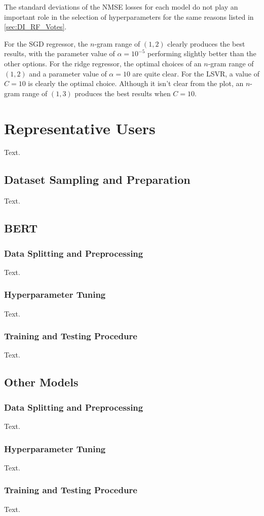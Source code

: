 The standard deviations of the NMSE losses for each model do not play an important role in the selection of hyperparameters for the same reasons listed in \ref{sec:DI_RF_Votes}.

For the SGD regressor, the $n$-gram range of $(1, 2)$ clearly produces the best results, with the parameter value of $\alpha=10^{-5}$ performing slightly better than the other options. For the ridge regressor, the optimal choices of an $n$-gram range of $(1, 2)$ and a parameter value of $\alpha=10$ are quite clear. For the LSVR, a value of $C=10$ is clearly the optimal choice. Although it isn't clear from the plot, an $n$-gram range of $(1, 3)$ produces the best results when $C=10$.

\section{Representative Users} \label{sec:DI_RU}

Text.

\subsection{Dataset Sampling and Preparation}

Text.

\subsection{BERT}

\subsubsection{Data Splitting and Preprocessing}

Text.

\subsubsection{Hyperparameter Tuning}

Text.

\subsubsection{Training and Testing Procedure}

Text.

\subsection{Other Models}

\subsubsection{Data Splitting and Preprocessing}

Text.

\subsubsection{Hyperparameter Tuning}

Text.

\subsubsection{Training and Testing Procedure}

Text.
